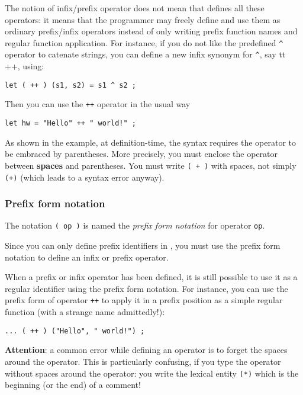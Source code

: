 The notion of infix/prefix operator does not mean that
{\focal} defines all these operators: it means that the programmer
may freely define and use them as ordinary
prefix/infix operators instead of only writing prefix function names and regular function
application. For instance, if you do not like the {\focal} predefined \verb"^"
operator to catenate strings, you can define a new infix synonym for \verb"^",
say {tt ++}, using:
{\scriptsize
\begin{lstlisting}
let ( ++ ) (s1, s2) = s1 ^ s2 ;
\end{lstlisting}
}
Then you can use the {\tt ++} operator in the usual way
{\scriptsize
\begin{lstlisting}
let hw = "Hello" ++ " world!" ;
\end{lstlisting}
}

As shown in the example, at definition-time, the syntax requires
the operator to be embraced by parentheses. More precisely, you must
enclose the operator between {\bf spaces} and parentheses.
You must write {\tt ( + )} with spaces, not simply {\tt (+)} (which leads
to a syntax error anyway).

\subsubsection{Prefix form notation}

The notation {\tt ( op )} is named the {\em prefix form notation} for
operator {\tt op}.

Since you can only define prefix identifiers in {\focal}, you must use the
prefix form notation to define an infix or prefix operator.

When a prefix or infix operator has been defined, it is still possible
to use it as a regular identifier using the prefix form notation.
For instance, you can use the prefix form of operator {\tt ++}
to apply it in a prefix position as a simple regular function (with a
strange name admittedly!):

{\scriptsize
\begin{lstlisting}
... ( ++ ) ("Hello", " world!") ;
\end{lstlisting}
}

{\bf Attention}: a common error while defining an operator is to forget
the spaces around the operator. This is particularly confusing, if you
type the {\tt *} operator without spaces around the operator: you
write the lexical entity {\tt (*)} which is the beginning (or the end)
of a comment!

